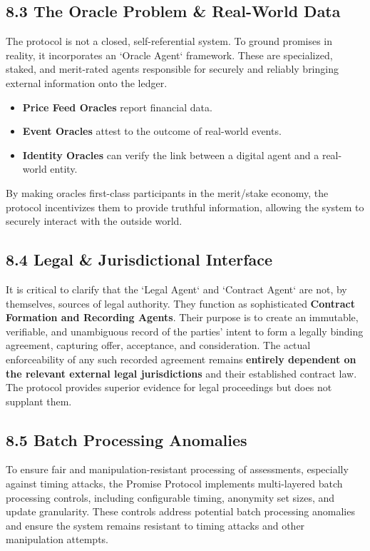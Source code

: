 \documentclass[11pt]{article}
\begin{document}
\subsection{8.3 The Oracle Problem \& Real-World Data}
\label{sec:org06394f9}
The protocol is not a closed, self-referential system. To ground promises in reality, it incorporates an `Oracle Agent` framework. These are specialized, staked, and merit-rated agents responsible for securely and reliably bringing external information onto the ledger.
\begin{itemize}
\item \textbf{Price Feed Oracles} report financial data.
\item \textbf{Event Oracles} attest to the outcome of real-world events.
\item \textbf{Identity Oracles} can verify the link between a digital agent and a real-world entity.
\end{itemize}
By making oracles first-class participants in the merit/stake economy, the protocol incentivizes them to provide truthful information, allowing the system to securely interact with the outside world.
\subsection{8.4 Legal \& Jurisdictional Interface}
\label{sec:orga72c524}
It is critical to clarify that the `Legal Agent` and `Contract Agent` are not, by themselves, sources of legal authority. They function as sophisticated \textbf{\textbf{Contract Formation and Recording Agents}}. Their purpose is to create an immutable, verifiable, and unambiguous record of the parties' intent to form a legally binding agreement, capturing offer, acceptance, and consideration. The actual enforceability of any such recorded agreement remains \textbf{entirely dependent on the relevant external legal jurisdictions} and their established contract law. The protocol provides superior evidence for legal proceedings but does not supplant them.
\subsection{8.5 Batch Processing Anomalies}
\label{sec:orgcf4c07e}
To ensure fair and manipulation-resistant processing of assessments, especially against timing attacks, the Promise Protocol implements multi-layered batch processing controls, including configurable timing, anonymity set sizes, and update granularity. These controls address potential batch processing anomalies and ensure the system remains resistant to timing attacks and other manipulation attempts.
\end{document}
